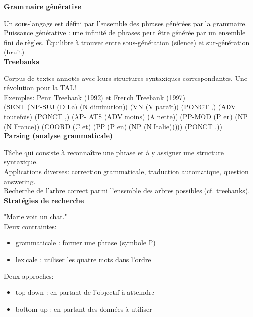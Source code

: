 \textbf{Grammaire générative}

Un sous-langage est défini par l'ensemble des phrases générées par la grammaire. Puissance générative : une infinité de phrases peut être générée par un ensemble fini de règles. Équilibre à trouver entre sous-génération (silence) et sur-génération (bruit). \\

\textbf{Treebanks}

Corpus de textes annotés avec leurs structures syntaxiques correspondantes. Une révolution pour la TAL! \\

Exemples: Penn Treebank (1992) et French Treebank (1997)\\

(SENT (NP-SUJ (D La) (N diminution)) (VN (V
paraît)) (PONCT ,) (ADV toutefois) (PONCT ,) (AP-
ATS (ADV moins) (A nette)) (PP-MOD (P en) (NP
(N France)) (COORD (C et) (PP (P en) (NP (N
Italie))))) (PONCT .)) \\

\textbf{Parsing (analyse grammaticale)}

Tâche qui consiste à reconnaître une phrase et à y assigner une structure syntaxique.\\

Applications diverses: correction grammaticale, traduction automatique, question answering.\\

Recherche de l'arbre correct parmi l'ensemble des arbres possibles (cf. treebanks).\\

\textbf{Stratégies de recherche}

"Marie voit un chat."\\

Deux contraintes:

\begin{itemize}
    \item grammaticale : former une phrase (symbole P)
    \item lexicale : utiliser les quatre mots dans l'ordre
\end{itemize}

Deux approches:

\begin{itemize}
    \item top-down : en partant de l'objectif à atteindre
    \item bottom-up : en partant des données à utiliser\\
\end{itemize}

